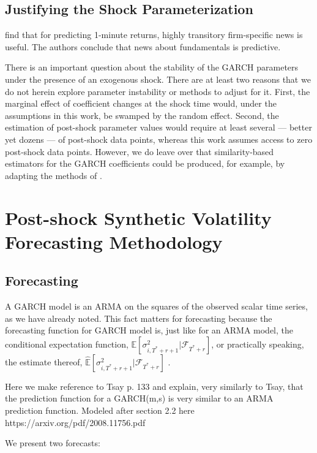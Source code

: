 \documentclass[11pt]{article}
\theoremstyle{definition}
\begin{document}
    \subsection{Justifying the Shock Parameterization}
  
    
    \citet{chinco2019sparse} find that for predicting 1-minute returns, highly transitory firm-specific news is useful.  The authors conclude that news about fundamentals is predictive.

    There is an important question about the stability of the GARCH parameters under the presence of an exogenous shock.  There are at least two reasons that we do not herein explore parameter instability or methods to adjust for it.  First, the marginal effect of coefficient changes at the shock time would, under the assumptions in this work, be swamped by the random effect.  Second, the estimation of post-shock parameter values would require at least several --- better yet dozens --- of post-shock data points, whereas this work assumes access to zero post-shock data points.  However, we do leave over that similarity-based estimators for the GARCH coefficients could be produced, for example, by adapting the methods of \citet{dendramis2020similarity}.

\section{Post-shock Synthetic Volatility Forecasting Methodology}


\subsection{Forecasting}

A GARCH model is an ARMA on the squares of the observed scalar time series, as we have already noted.  This fact matters for forecasting because the forecasting function for GARCH model is, just like for an ARMA model, the conditional expectation function, $\mathbb{E}[ \sigma^{2}_{i,T^{*}+r+1} | \mathcal{F}_{T^{*}+r}]$, or practically speaking, the estimate thereof, $\hat{\mathbb{E}}[ \sigma^{2}_{i,T^{*}+r+1} |\mathcal{F}_{T^{*}+r}]$ \citep{zivot2009practical}.

Here we make reference to Tsay p. 133 and explain, very similarly to Tsay, that the prediction function for a GARCH(m,s) is very similar to an ARMA prediction function.  Modeled after section 2.2 here https://arxiv.org/pdf/2008.11756.pdf

We present two forecasts:
\end{document}
